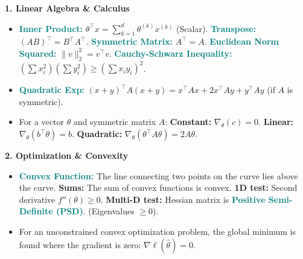\documentclass{article}
\newcommand{\hlhighlight}[1]{\par\vspace{1.5pt}\noindent\colorbox{yellow!50}{\parbox{\dimexpr\columnwidth-2\fboxsep\relax}{\textbf{#1}}}\par\vspace{0.5pt}}
\newcommand{\sectitle}[1]{\par\textbf{\color{blue!70!black}{#1}}\par}
\newcommand{\concept}[1]{\textcolor{teal}{\textbf{#1}}}
\newcommand{\lbl}[1]{\textcolor{green!60!black}{\textbf{#1}}}
\begin{document}
\pagestyle{empty}

\fontsize{4.5pt}{4.5pt}\selectfont

\setlength{\columnsep}{5pt}

\begin{multicols}{7}

\hlhighlight{1. Linear Algebra \& Calculus}
\sectitle{Vectors \& Matrices}
\begin{itemize}
    \item \concept{Inner Product:} $\theta^\top x = \sum_{k=1}^d \theta^{(k)} x^{(k)}$ (Scalar). \concept{Transpose:} $(AB)^\top = B^\top A^\top$. \concept{Symmetric Matrix:} $A^\top = A$. \concept{Euclidean Norm Squared:} $\|v\|_2^2 = v^\top v$. \concept{Cauchy-Schwarz Inequality:} $(\sum x_i^2)(\sum y_i^2) \geq (\sum x_i y_i)^2$.
    \item \concept{Quadratic Exp:} $(x+y)^\top A (x+y) = x^\top Ax + 2x^\top Ay + y^\top Ay$ (if $A$ is symmetric).
\end{itemize}
\sectitle{Matrix Calculus Rules}
\begin{itemize}
    \item For a vector $\theta$ and symmetric matrix $A$: \lbl{Constant:} $\nabla_\theta (c) = 0$. \lbl{Linear:} $\nabla_\theta (b^\top \theta) = b$. \lbl{Quadratic:} $\nabla_\theta (\theta^\top A \theta) = 2A\theta$.
\end{itemize}

\hlhighlight{2. Optimization \& Convexity}
\sectitle{Convexity Definitions}
\begin{itemize}
    \item \concept{Convex Function:} The line connecting two points on the curve lies above the curve. \lbl{Sums:} The sum of convex functions is convex. \lbl{1D test:} Second derivative $f''(\theta) \geq 0$. \lbl{Multi-D test:} Hessian matrix is \concept{Positive Semi-Definite (PSD)}. (Eigenvalues $\geq 0$).
\end{itemize}
\sectitle{First-Order Optimality Condition}
\begin{itemize}
    \item For an unconstrained convex optimization problem, the global minimum is found where the gradient is zero: $\nabla \ell(\hat{\theta}) = 0$.
\end{itemize}


\end{multicols}
\end{document}
